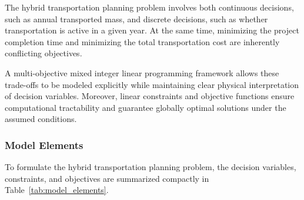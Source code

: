 \documentclass[12pt]{mcmthesis}
\begin{document}
The hybrid transportation planning problem involves both continuous decisions, such as annual transported mass, and discrete decisions, such as whether transportation is active in a given year.
At the same time, minimizing the project completion time and minimizing the total transportation cost are inherently conflicting objectives.

A multi-objective mixed integer linear programming framework allows these trade-offs to be modeled explicitly while maintaining clear physical interpretation of decision variables. Moreover, linear constraints and objective functions ensure computational tractability and guarantee globally optimal solutions under the assumed conditions.

\subsubsection{Model Elements}

To formulate the hybrid transportation planning problem, the decision variables, constraints, and objectives are summarized compactly in Table~\ref{tab:model_elements}.

\renewcommand{\arraystretch}{1.25}
\setlength{\tabcolsep}{6pt}
\end{document}

